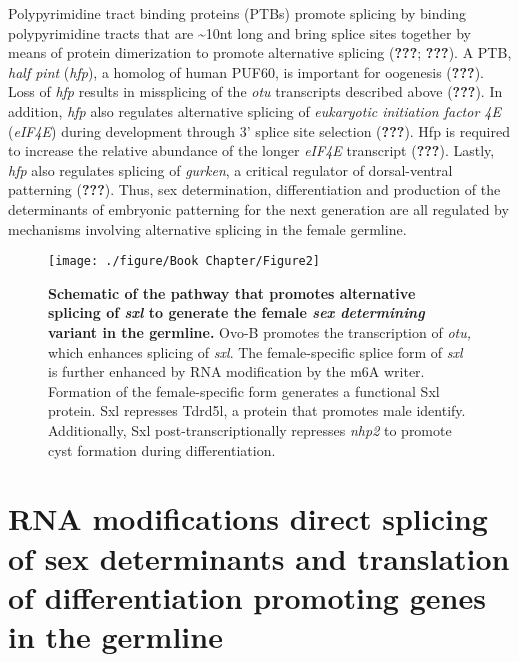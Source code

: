 \documentclass[12pt,oneside]{reedthesis}
\begin{document}
Polypyrimidine tract binding proteins (PTBs) promote splicing by binding
polypyrimidine tracts that are \textasciitilde10nt long and bring splice sites
together by means of protein dimerization to promote alternative
splicing ({\textbf{???}}; {\textbf{???}}). A PTB, \emph{half pint}
(\emph{hfp}), a homolog of human PUF60, is important for oogenesis
({\textbf{???}}). Loss of \emph{hfp} results in missplicing of the \emph{otu}
transcripts described above ({\textbf{???}}). In addition, \emph{hfp}
also regulates alternative splicing of \emph{eukaryotic initiation factor 4E}
(\emph{eIF4E}) during development through 3' splice site selection
({\textbf{???}}). Hfp is required to increase the relative abundance of
the longer \emph{eIF4E} transcript ({\textbf{???}}). Lastly, \emph{hfp} also
regulates splicing of \emph{gurken}, a critical regulator of dorsal-ventral
patterning ({\textbf{???}}). Thus, sex determination, differentiation
and production of the determinants of embryonic patterning for the next
generation are all regulated by mechanisms involving alternative
splicing in the female germline.
\begin{figure}

{\centering \texttt{[image: ./figure/Book Chapter/Figure2]} 

}

\caption[\textbf{Schematic of the pathway that promotes alternative splicing of \emph{sxl}.}]{\textbf{Schematic of the pathway that promotes alternative splicing of \emph{sxl} to generate the female \emph{sex determining} variant in the germline.} Ovo-B promotes the transcription of \emph{otu,} which enhances splicing of \emph{sxl}. The female-specific splice form of \emph{sxl} is further enhanced by RNA modification by the m6A writer. Formation of the female-specific form generates a functional Sxl protein. Sxl represses Tdrd5l, a protein that promotes male identify. Additionally, Sxl post-transcriptionally represses \emph{nhp2} to promote cyst formation during differentiation.}\label{fig:unnamed-chunk-3}
\end{figure}
\hypertarget{rna-modifications-direct-splicing-of-sex-determinants-and-translation-of-differentiation-promoting-genes-in-the-germline}{%
\section{RNA modifications direct splicing of sex determinants and translation of differentiation promoting genes in the germline}\label{rna-modifications-direct-splicing-of-sex-determinants-and-translation-of-differentiation-promoting-genes-in-the-germline}}
\end{document}
